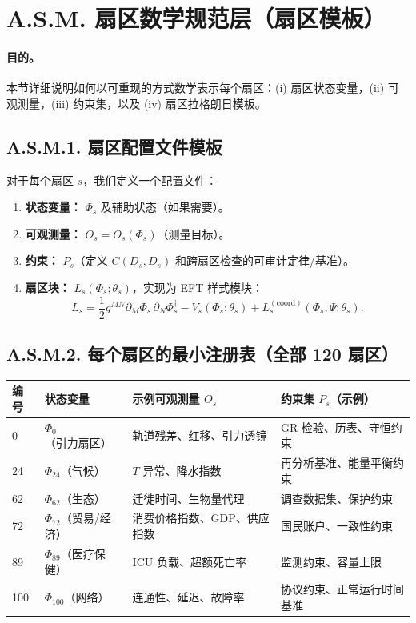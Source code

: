 \documentclass[11pt,a4paper]{article}
\begin{document}
	\section*{A.S.M. 扇区数学规范层（扇区模板）}
	\label{sec:sector-math-layer}
	
	\paragraph{目的。}
	本节详细说明如何以可重现的方式数学表示每个扇区：(i) 扇区状态变量，(ii) 可观测量，(iii) 约束集，以及 (iv) 扇区拉格朗日模板。
	
	\subsection*{A.S.M.1. 扇区配置文件模板}
	
	对于每个扇区 $s$，我们定义一个配置文件：
	\begin{enumerate}[leftmargin=*]
		\item \textbf{状态变量：} $\Phi_s$ 及辅助状态（如果需要）。
		\item \textbf{可观测量：} $O_s=O_s(\Phi_s)$（测量目标）。
		\item \textbf{约束：} $P_s$（定义 $C(D_s,D_s)$ 和跨扇区检查的可审计定律/基准）。
		\item \textbf{扇区块：} $L_s(\Phi_s;\theta_s)$，实现为 EFT 样式模块：
		$$
		L_s = \frac{1}{2}g^{MN}\partial_M\Phi_s\,\partial_N\Phi_s^\dagger - V_s(\Phi_s;\theta_s) + L^{(\mathrm{coord})}_s(\Phi_s,\Psi;\theta_s).
		$$
	\end{enumerate}
	
	\subsection*{A.S.M.2. 每个扇区的最小注册表（全部 120 扇区）}
	
	\begin{longtable}{|p{0.8cm}|p{4.2cm}|p{4.5cm}|p{4.7cm}|}
		\hline
		\textbf{编号} & \textbf{状态变量} & \textbf{示例可观测量 $O_s$} & \textbf{约束集 $P_s$（示例）} \\
		\hline
		\endhead
		0 & $\Phi_0$（引力扇区） & 轨道残差、红移、引力透镜 & GR 检验、历表、守恒约束 \\
		24 & $\Phi_{24}$（气候） & $T$ 异常、降水指数 & 再分析基准、能量平衡约束 \\
		62 & $\Phi_{62}$（生态） & 迁徙时间、生物量代理 & 调查数据集、保护约束 \\
		72 & $\Phi_{72}$（贸易/经济） & 消费价格指数、GDP、供应指数 & 国民账户、一致性约束 \\
		89 & $\Phi_{89}$（医疗保健） & ICU 负载、超额死亡率 & 监测约束、容量上限 \\
		100 & $\Phi_{100}$（网络） & 连通性、延迟、故障率 & 协议约束、正常运行时间基准 \\
		\hline
	\end{longtable}
	
\end{document}
